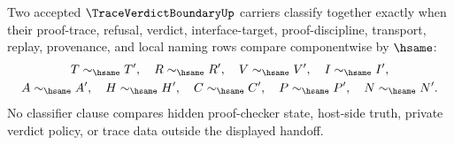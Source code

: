 \begin{definition}
\label{def:trace-verdict-boundary-classifier}
Two accepted $\TraceVerdictBoundaryUp$ carriers classify together exactly when their proof-trace, refusal, verdict, interface-target, proof-discipline, transport, replay, provenance, and local naming rows compare componentwise by $\hsame$:
$$
\begin{gathered}
T\sim_{\hsame}T',\quad R\sim_{\hsame}R',\quad V\sim_{\hsame}V',\quad I\sim_{\hsame}I',\\
A\sim_{\hsame}A',\quad H\sim_{\hsame}H',\quad C\sim_{\hsame}C',\quad P\sim_{\hsame}P',\quad N\sim_{\hsame}N'.
\end{gathered}
$$
No classifier clause compares hidden proof-checker state, host-side truth, private verdict policy, or trace data outside the displayed handoff.
\end{definition}

